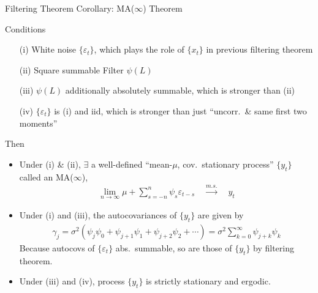 \documentclass[aspectratio=169, handout]{beamer}
\newcommand{\ra}{\rightarrow}
\newcommand{\msto}{\xrightarrow{m.s.}}
\begin{document}
{\scriptsize
\begin{frame}{Filtering Theorem Corollary: MA($\infty$) Theorem}

Conditions
\vspace{-8pt}
\begin{itemize}
  \item[(i)]
    \alert{White noise} $\{\varepsilon_t\}$, which plays the role of
    $\{x_t\}$ in previous filtering theorem
  \item[(ii)] \alert{Square summable} Filter $\psi(L)$

  \item[(iii)] $\psi(L)$ additionally \alert{absolutely summable}, which
    is stronger than (ii)

  \item[(iv)] $\{\varepsilon_t\}$ is (i) and iid, which is stronger than
    just ``uncorr.\ \& same first two moments''
\end{itemize}
\pause
Then
\vspace{-10pt}
\begin{itemize}
  \item
    Under (i) \& (ii), $\exists$ a well-defined
    ``mean-$\mu$, cov.\ stationary process'' $\{y_t\}$
    called an \alert{MA($\infty$)},
    \vspace{-15pt}
    \begin{align*}
      \lim_{n\ra\infty}
      \mu + \sum_{s=-n}^n \psi_s \varepsilon_{t-s}
      \quad\msto\quad
      y_t
    \end{align*}
    \pause

  \item
    Under (i) and (iii), the autocovariances of $\{y_t\}$ are given by
    \vspace{-10pt}
    \begin{align*}
      \gamma_j
      = \sigma^2(\psi_j\psi_0 + \psi_{j+1}\psi_1 + \psi_{j+2}\psi_2 +\cdots)
      = \sigma^2\sum_{k=0}^\infty \psi_{j+k}\psi_k
    \end{align*}
    \pause
    Because autocovs of $\{\varepsilon_t\}$ abs.\ summable, so
    are those of $\{y_t\}$ by filtering theorem.
    \pause

  \item
    Under (iii) and (iv), process $\{y_t\}$ is strictly stationary and
    ergodic.

\end{itemize}
\end{frame}
}
\end{document}
